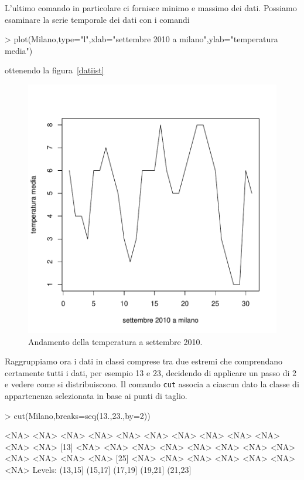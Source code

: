 \documentclass[onecolumn,12pt]{book}
\begin{document}
L'ultimo comando in particolare ci fornisce minimo e massimo dei dati.
Possiamo esaminare la serie temporale dei dati con i comandi
\begin{Schunk}
\begin{Sinput}
> plot(Milano,type="l",xlab="settembre 2010 a milano",ylab="temperatura media")
\end{Sinput}
\end{Schunk}
ottenendo la figura~\ref{datiist}
\begin{figure}[htbp]
\begin{center}
\includegraphics{RbookParte2-029}
\caption{ Andamento della temperatura a settembre 2010. }
\label{fig:datiist}
\end{center}
\end{figure}

Raggruppiamo ora i dati in classi comprese  tra due estremi che comprendano certamente tutti i dati, per esempio 13 e 23, decidendo di applicare un passo di 2 e vedere come si distribuiscono. Il comando \texttt{cut} associa a ciascun dato la classe di appartenenza selezionata in base ai punti di taglio.

\begin{Schunk}
\begin{Sinput}
> cut(Milano,breaks=seq(13.,23.,by=2))
\end{Sinput}
\begin{Soutput}
 [1] <NA> <NA> <NA> <NA> <NA> <NA> <NA> <NA> <NA> <NA> <NA> <NA>
[13] <NA> <NA> <NA> <NA> <NA> <NA> <NA> <NA> <NA> <NA> <NA> <NA>
[25] <NA> <NA> <NA> <NA> <NA> <NA> <NA>
Levels: (13,15] (15,17] (17,19] (19,21] (21,23]
\end{Soutput}
\end{Schunk}
\end{document}

